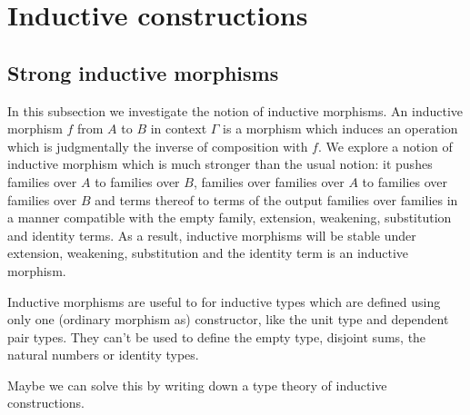 \section{Inductive constructions}

\subsection{Strong inductive morphisms}
In this subsection we investigate the notion of inductive morphisms. An 
inductive morphism $f$ from $A$ to $B$ in context $\Gamma$ is a morphism which
induces an operation which is judgmentally the inverse of composition
with $f$. We explore a notion of inductive morphism which is much stronger
than the usual notion: it pushes families over $A$ to families over $B$,
families over families over $A$ to families over families over $B$ and terms
thereof to terms of the output families over families in a manner compatible
with the empty family, extension, weakening, substitution and identity terms.
As a result, inductive morphisms will be stable under extension, weakening,
substitution and the identity term is an inductive morphism.

Inductive morphisms are useful to for inductive types which are defined using
only one (ordinary morphism as) constructor, like the unit type and dependent 
pair types.
They can't be used to define the empty type, disjoint sums,
the natural numbers or identity types. 

{\color{red} Maybe
we can solve this by writing down a type theory of inductive constructions.}


